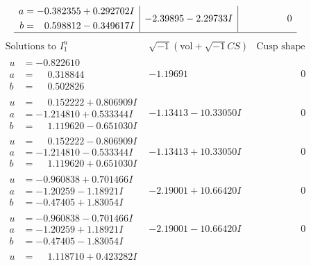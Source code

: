 \documentclass[1p]{elsarticle_modified}
\theoremstyle{definition}
\newcommand{\I}{\sqrt{-1}}
\begin{document}
$$\begin{array}{c|c|c}
\begin{aligned}
a &= -0.382355 + 0.292702 I \\
b &= \phantom{-}0.598812 - 0.349617 I\end{aligned}
 & -2.39895 - 2.29733 I & \phantom{-0.000000 } 0\\
 \hline 
 \end{array}$$\newpage$$\begin{array}{c|c|c}  
\text{Solutions to }I^u_{1}& \I (\text{vol} + \sqrt{-1}CS) & \text{Cusp shape}\\
 \hline 
\begin{aligned}
u &= -0.822610\phantom{ +0.000000I} \\
a &= \phantom{-}0.318844\phantom{ +0.000000I} \\
b &= \phantom{-}0.502826\phantom{ +0.000000I}\end{aligned}
 & -1.19691\phantom{ +0.000000I} & \phantom{-0.000000 } 0 \\ \hline\begin{aligned}
u &= \phantom{-}0.152222 + 0.806909 I \\
a &= -1.214810 + 0.533344 I \\
b &= \phantom{-}1.119620 - 0.651030 I\end{aligned}
 & -1.13413 - 10.33050 I & \phantom{-0.000000 } 0 \\ \hline\begin{aligned}
u &= \phantom{-}0.152222 - 0.806909 I \\
a &= -1.214810 - 0.533344 I \\
b &= \phantom{-}1.119620 + 0.651030 I\end{aligned}
 & -1.13413 + 10.33050 I & \phantom{-0.000000 } 0 \\ \hline\begin{aligned}
u &= -0.960838 + 0.701466 I \\
a &= -1.20259 - 1.18921 I \\
b &= -0.47405 + 1.83054 I\end{aligned}
 & -2.19001 + 10.66420 I & \phantom{-0.000000 } 0 \\ \hline\begin{aligned}
u &= -0.960838 - 0.701466 I \\
a &= -1.20259 + 1.18921 I \\
b &= -0.47405 - 1.83054 I\end{aligned}
 & -2.19001 - 10.66420 I & \phantom{-0.000000 } 0 \\ \hline\begin{aligned}
u &= \phantom{-}1.118710 + 0.423282 I \\

\end{aligned}
\end{array}$$
\end{document}
